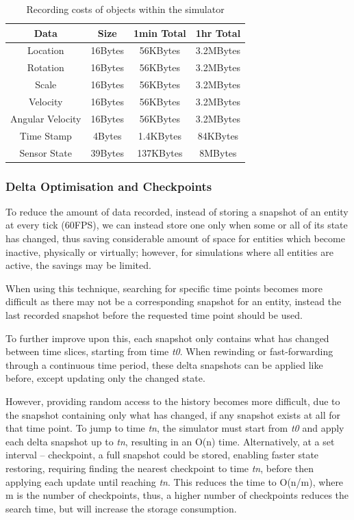 \begin{table}
	\centering
	\caption{Recording costs of objects within the simulator}
	\begin{tabular}{|c|c|c|c|}
	\hline
	Data & Size & 1min Total & 1hr Total\\\hline
	Location & 16Bytes & 56KBytes & 3.2MBytes\\\hline
	Rotation & 16Bytes & 56KBytes & 3.2MBytes\\\hline
	Scale & 16Bytes & 56KBytes & 3.2MBytes\\\hline
	Velocity & 16Bytes & 56KBytes & 3.2MBytes\\\hline
	Angular Velocity & 16Bytes & 56KBytes & 3.2MBytes\\\hline
	Time Stamp & 4Bytes & 1.4KBytes & 84KBytes\\\hline
	Sensor State & 39Bytes & 137KBytes & 8MBytes\\\hline

	\end{tabular}
	\label{tab:recording_costs}
\end{table}

\subsubsection{Delta Optimisation and Checkpoints} %
\label{sub:compressed}
To reduce the amount of data recorded, instead of storing a snapshot of an entity at every tick (60FPS), we can instead store one only when some or all of its state has changed, thus saving considerable amount of space for entities which become inactive, physically or virtually; however, for simulations where all entities are active, the savings may be limited. 

When using this technique, searching for specific time points becomes more difficult as there may not be a corresponding snapshot for an entity, instead the last recorded snapshot before the requested time point should be used.

To further improve upon this, each snapshot only contains what has changed between time slices, starting from time \textit{t0}. When rewinding or fast-forwarding through a continuous time period, these delta snapshots can be applied like before, except updating only the changed state. 

However, providing random access to the history becomes more difficult, due to the snapshot containing only what has changed, if any snapshot exists at all for that time point. To jump to time \textit{tn}, the simulator must start from \textit{t0} and apply each delta snapshot up to \textit{tn}, resulting in an O(n) time. Alternatively, at a set interval -- checkpoint, a full snapshot could be stored, enabling faster state restoring, requiring finding the nearest checkpoint to time \textit{tn}, before then applying each update until reaching \textit{tn}. This reduces the time to O(n/m), where m is the number of checkpoints, thus, a higher number of checkpoints reduces the search time, but will increase the storage consumption.

